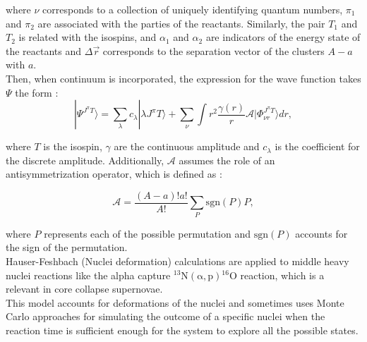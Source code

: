 \documentclass[openany]{book}
\begin{document}
where $\nu$ corresponds to a collection of uniquely identifying quantum numbers, $\pi_1$ and $\pi_2$ are associated with the parties of the reactants. Similarly, the pair  $T_1$ and $T_2$ is related with the isospins, and $\alpha_1$ and $\alpha_2$ are indicators of the energy state of the reactants and  $\Delta \vec r$ corresponds to the separation vector of the clusters $A - a$ with $a$.\\

Then, when continuum is incorporated, the expression for the wave function takes $\Psi$ the form \cite{dohet-eraly_navratil_quaglioni_horiuchi_hupin_raimondi_2016}:  \\



\begin{equation}\label{eq:micro_noCoreShell_continuum}
	| \Psi^{J^{\pi} T} \rangle  = \sum_{\lambda} c_\lambda | \lambda J^{\pi} T \rangle  + \sum_{\nu} { \int {r^2 \frac{\gamma(r)}{r} \hat {\mathcal{A} }  | \Phi^{J^{\pi} T}_{\nu r} \rangle dr} },
\end{equation}

where $T$ is the isospin,  $\gamma$ are the continuous amplitude and $c_\lambda$ is the coefficient for the discrete amplitude. Additionally, $\mathcal{A}$ assumes the role of an antisymmetrization operator, which is defined as \cite{freer_horiuchi_kanada-enyo_lee_meisner_2018}: 

\begin{equation}\label{eq:micro_noCoreShell_antisymmetrization}
	\mathcal{A} = \frac{(A - a)! a!}{A!}  \sum_{P} \mathrm{sgn} (P) P,
\end{equation}

where $P$ represents each of the possible permutation and $\mathrm{sgn}(P)$ accounts for the sign of the permutation. \\ 

Hauser-Feshbach (Nuclei deformation) \cite{jayatissa_avila_rehm_talwar_mohr_auranen_chen_gorelov_hoffman_jiang_et_2022} calculations are applied to middle heavy nuclei reactions like the alpha capture $\mathrm{{}^{13}N(\alpha, p) {}^{16}O}$ reaction, which is a relevant in core collapse supernovae.  \\

This model accounts for deformations of the nuclei and sometimes uses Monte Carlo approaches for simulating the outcome of a specific nuclei when the reaction time is sufficient enough for the system to explore all the possible states. \\
\end{document}
